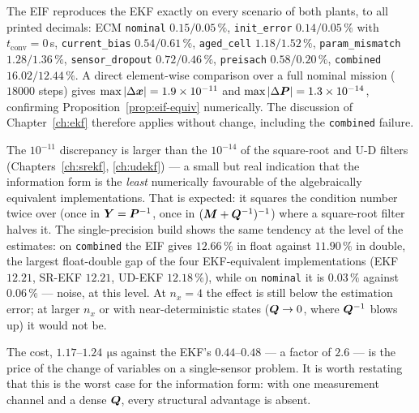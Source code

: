 The EIF reproduces the EKF exactly on every scenario of both plants, to all printed decimals:
ECM \texttt{nominal} $0.15/0.05\,\%$, \texttt{init\_error} $0.14/0.05\,\%$ with
$t_{\text{conv}} = 0$\,s, \texttt{current\_bias} $0.54/0.61\,\%$, \texttt{aged\_cell}
$1.18/1.52\,\%$, \texttt{param\_mismatch} $1.28/1.36\,\%$, \texttt{sensor\_dropout}
$0.72/0.46\,\%$, \texttt{preisach} $0.58/0.20\,\%$, \texttt{combined} $16.02/12.44\,\%$. A
direct element-wise comparison over a full nominal mission ($\num{18000}$ steps) gives
$\max\left\lvert \Delta\bm{x} \right\rvert = 1.9\times10^{-11}$ and $\max\left\lvert \Delta\bm{P} \right\rvert = 1.3\times10^{-14}$,
confirming Proposition~\ref{prop:eif-equiv} numerically. The discussion of
Chapter~\ref{ch:ekf} therefore applies without change, including the \texttt{combined} failure.

The $10^{-11}$ discrepancy is larger than the $10^{-14}$ of the square-root and U-D filters
(Chapters~\ref{ch:srekf}, \ref{ch:udekf}) --- a small but real indication that the information
form is the \emph{least} numerically favourable of the algebraically equivalent
implementations. That is expected: it squares the condition number twice over (once in
$\bm{Y} = \bm{P}^{-1}$, once in $(\bm{M}+\bm{Q}^{-1})^{-1}$) where a square-root filter halves it. The
single-precision build shows the same tendency at the level of the estimates: on
\texttt{combined} the EIF gives $12.66\,\%$ in float against $11.90\,\%$ in double, the largest
float-double gap of the four EKF-equivalent implementations (EKF $12.21$, SR-EKF $12.21$,
UD-EKF $12.18\,\%$), while on \texttt{nominal} it is $0.03\,\%$ against $0.06\,\%$ --- noise, at
this level. At $n_x = 4$ the effect is still below the estimation error; at larger $n_x$ or with
near-deterministic states ($\bm{Q}\to0$, where $\bm{Q}^{-1}$ blows up) it would not be.

The cost, $1.17$--$1.24\,\SI{}{\micro\second}$ against the EKF's $0.44$--$0.48$ --- a factor of
$2.6$ --- is the price of the change of variables on a single-sensor problem. It is worth
restating that this is the worst case for the information form: with one measurement channel and
a dense $\bm{Q}$, every structural advantage is absent.

